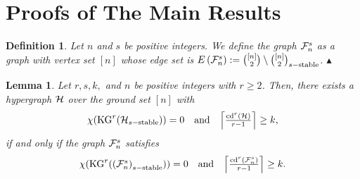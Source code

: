 \documentclass[11pt]{article}
\newtheorem{predefin}{{\bf Definition}}
\newenvironment{defin}[1]{\begin{predefin}{\hspace{-0.5
                   em}{\bf.\ }}{\rm #1}\hfill{$\blacktriangle$}}{\end{predefin}}
\newtheorem{prelem}{{\bf Lemma}}
\newenvironment{lem}{\begin{prelem}{\hspace{-0.5
               em}{\bf.\ }}}{\end{prelem}}
\begin{document}

\section{Proofs of The Main Results}

\begin{defin}{
	Let $n$ and $s$ be positive integers. We define the graph
	${\cal F}_{n}^{s}$ as a graph with vertex set $[n]$ whose
	edge set is $E \left(  {\cal F}_{n}^{s}  \right) := {[n] \choose 2} \setminus {[n] \choose 2}_{s-{\rm stable}}$.
}
\end{defin}

\begin{lem} \label{restriction}
	Let $r, s, k,$ and $n$ be positive integers with $r\geq 2$.
	Then, there exists a hypergraph ${\cal H}$ over the ground set $[n]$ with
	$$\begin{array}[1]{ccc}
		\chi ({\rm KG}^r ({\cal H}_{s-{\rm stable}}))=0  &  {\rm and}   &
		\left\lceil  \frac{{\rm cd}^r ({\cal H})}{r-1}   \right\rceil  \geq k,
	\end{array}  $$
	if and only if the graph ${\cal F}_{n}^{s}$ satisfies
	$$\begin{array}[1]{ccc}
		\chi ({\rm KG}^r (\left({\cal F}_{n}^{s}\right)_{s-{\rm stable}}))=0  &  {\rm and}   &
		\left\lceil  \frac{{\rm cd}^r \left({\cal F}_{n}^{s}\right)}{r-1}   \right\rceil  \geq k.
	\end{array}  $$	
\end{lem}
\end{document}
